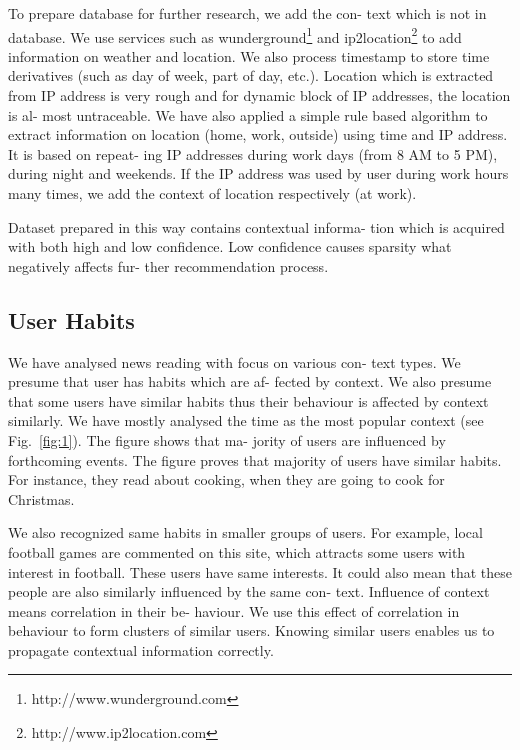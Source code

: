 \documentclass{acm_proc_article-sp} %
\begin{document}
To prepare database for further research, we add the con-
text which is not in database. We use services such as
wunderground\footnote{http://www.wunderground.com} and 
ip2location\footnote{http://www.ip2location.com} to add information on
weather and location. We also process timestamp to store
time derivatives (such as day of week, part of day, etc.).
Location which is extracted from IP address is very rough
and for dynamic block of IP addresses, the location is al-
most untraceable. We have also applied a simple rule based
algorithm to extract information on location (home, work,
outside) using time and IP address. It is based on repeat-
ing IP addresses during work days (from 8 AM to 5 PM),
during night and weekends. If the IP address was used by
user during work hours many times, we add the context of
location respectively (at work).

Dataset prepared in this way contains contextual informa-
tion which is acquired with both high and low confidence.
Low confidence causes sparsity what negatively affects fur-
ther recommendation process.

\subsection{User Habits}

We have analysed news reading with focus on various con-
text types. We presume that user has habits which are af-
fected by context. We also presume that some users have
similar habits thus their behaviour is affected by context
similarly. We have mostly analysed the time as the most
popular context (see Fig.~\ref{fig:1}). The figure shows that ma-
jority of users are influenced by forthcoming events. The
figure proves that majority of users have similar habits. For
instance, they read about cooking, when they are going to
cook for Christmas.

We also recognized same habits in smaller groups of users.
For example, local football games are commented on this
site, which attracts some users with interest in football.
These users have same interests. It could also mean that
these people are also similarly influenced by the same con-
text. Influence of context means correlation in their be-
haviour. We use this effect of correlation in behaviour to
form clusters of similar users. Knowing similar users enables
us to propagate contextual information correctly.
\end{document}
